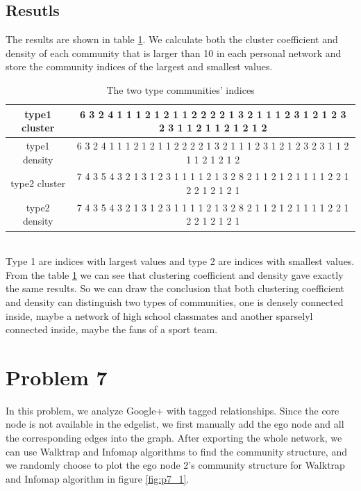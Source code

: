 \documentclass{article}
\begin{document}
\subsection{Resutls}
The results are shown in table \ref{tb:type}. We calculate both the cluster coefficient and density of each community that is larger than 10 in each personal network and store the community indices of the largest and smallest values.\\
\begin{table}[hbp]
\caption{The two type communities' indices}
\begin{adjustbox}{center}
\label{tb:type}
\begin{tabular}{|c|c|}
\hline
type1 cluster &6 3 2 4 1 1 1 2 1 2 1 1 2 2 2 2 1 3 2 1 1 1 2 3 1 2 1 2 3 2 3 1 1 2 1 1 2 1 2 1 2\\
\hline
type1 density &6 3 2 4 1 1 1 2 1 2 1 1 2 2 2 2 1 3 2 1 1 1 2 3 1 2 1 2 3 2 3 1 1 2 1 1 2 1 2 1 2\\
\hline
type2 cluster &7 4 3 5 4 3 2 1 3 1 2 3 1 1 1 1 2 1 3 2 8 2 1 1 2 1 2 1 1 1 1 2 2 1 2 2 1 2 1 2 1\\
\hline
type2 density &7 4 3 5 4 3 2 1 3 1 2 3 1 1 1 1 2 1 3 2 8 2 1 1 2 1 2 1 1 1 1 2 2 1 2 2 1 2 1 2 1\\
\hline
\end{tabular}
\end{adjustbox}
\end{table}
\\
Type 1 are indices with largest values and type 2 are indices with smallest values. From the table \ref{tb:type} we can see that clustering coefficient and density gave exactly the same results. So we can draw the conclusion that both clustering coefficient and density can distinguish two types of communities, one is densely connected inside, maybe a network of high school classmates and another sparselyl connected inside, maybe the fans of a sport team.


\section{Problem 7}
In this problem, we analyze Google+ with tagged relationships. Since the core node is not available in the edgelist, we first manually add the ego node and all the corresponding edges into the graph. After exporting the whole network, we can use Walktrap and Infomap algorithms to find the community structure, and we randomly choose to plot the ego node 2's community structure for Walktrap and Infomap algorithm in figure \ref{fig:p7_1}.\\
\\
\end{document}
